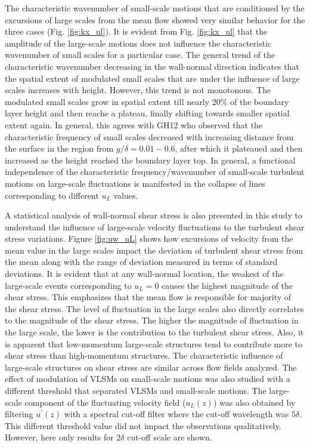 The characteristic wavenumber of small-scale motions that are conditioned by the excursions of large scales from the mean flow showed very similar behavior for the three cases (Fig. \ref{fig:kx_ul}).
It is evident from Fig. \ref{fig:kx_ul} that the amplitude of the large-scale motions does not influence the characteristic wavenumber of small scales for a particular case. The general trend of the characteristic wavenumber decreasing in the wall-normal direction indicates that the spatial extent of modulated small scales that are under the influence of large scales increases with height. However, this trend is not monotonous. The modulated small scales grow in spatial extent till nearly 20\% of the boundary layer height and then reache a plateau, finally shifting towards smaller spatial extent again. In general, this agrees with GH12 who observed that the characteristic frequency of small scales decreased with increasing distance from the surface in the region from $y/\delta=0.01-0.6$, after which it plateaued and then increased as the height reached the boundary layer top. In general, a functional independence of the characteristic frequency/wavenumber of small-scale turbulent motions on large-scale fluctuations is manifested in the collapse of lines corresponding to different $u_L$ values. 

A statistical analysis of wall-normal shear stress is also presented in this study to understand the influence of large-scale velocity fluctuations to the turbulent shear stress variations. Figure \ref{fig:uw_uL} shows how excursions of velocity from the mean value in the large scales impact the deviation of turbulent shear stress from the mean along with the range of deviation measured in terms of standard deviations. It is evident that at any wall-normal location, the weakest of the large-scale events corresponding to $u_L=0$ causes the highest magnitude of the shear stress. This emphasizes that the mean flow is responsible for majority of the shear stress. The level of fluctuation in the large scales also directly correlates to the magnitude of the shear stress. The higher the magnitude of fluctuation in the large scale, the lower is the contribution to the turbulent shear stress. Also, it is apparent that low-momentum large-scale structures tend to contribute more to shear stress than high-momentum structures. The characteristic influence of large-scale structures on shear stress are similar across flow fields analyzed. The effect of modulation of VLSMs on small-scale motions was also studied with a different threshold that separated VLSMs and small-scale motions. The large-scale component of the fluctuating velocity field ($u_L(z)$) was also obtained by filtering $u^\prime(z)$ with a spectral cut-off filter where the cut-off wavelength was $5\delta$. This different threshold value did not impact the observations qualitatively. However, here only results for $2\delta$ cut-off scale are shown.

